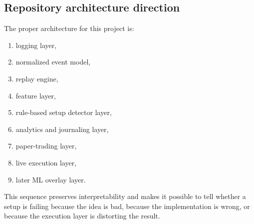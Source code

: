 \subsection{Repository architecture direction}

The proper architecture for this project is:

\begin{enumerate}
\item logging layer,
\item normalized event model,
\item replay engine,
\item feature layer,
\item rule-based setup detector layer,
\item analytics and journaling layer,
\item paper-trading layer,
\item live execution layer,
\item later ML overlay layer.
\end{enumerate}

This sequence preserves interpretability and makes it possible to tell whether a setup is failing because the idea is bad, because the implementation is wrong, or because the execution layer is distorting the result.

